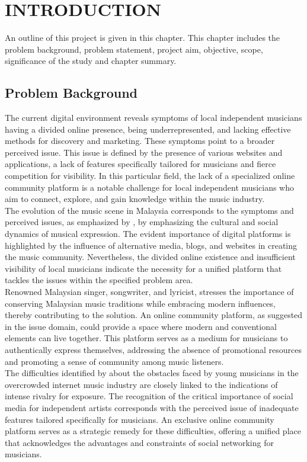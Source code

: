 \chapter{INTRODUCTION}
\label{ch:intro}
An outline of this project is given in this chapter. This chapter includes the problem background, problem statement, project aim, objective, scope, significance of the study and chapter summary.

\section{Problem Background}
The current digital environment reveals symptoms of local independent musicians having a divided online presence, being underrepresented, and lacking effective methods for discovery and marketing. These symptoms point to a broader perceived issue. This issue is defined by the presence of various websites and applications, a lack of features specifically tailored for musicians and fierce competition for visibility. In this particular field, the lack of a specialized online community platform is a notable challenge for local independent musicians who aim to connect, explore, and gain knowledge within the music industry. \\

The evolution of the music scene in Malaysia corresponds to the symptoms and perceived issues, as emphasized by \textcite{ong19}, by emphasizing the cultural and social dynamics of musical expression. The evident importance of digital platforms is highlighted by the influence of alternative media, blogs, and websites in creating the music community. Nevertheless, the divided online existence and insufficient visibility of local musicians indicate the necessity for a unified platform that tackles the issues within the specified problem area. \\

Renowned Malaysian singer, songwriter, and lyricist, \textcite{mohd21} stresses the importance of conserving Malaysian music traditions while embracing modern influences, thereby contributing to the solution. An online community platform, as suggested in the issue domain, could provide a space where modern and conventional elements can live together. This platform serves as a medium for musicians to authentically express themselves, addressing the absence of promotional resources and promoting a sense of community among music listeners. \\

The difficulties identified by \textcite{haynes18} about the obstacles faced by young musicians in the overcrowded internet music industry are closely linked to the indications of intense rivalry for exposure. The recognition of the critical importance of social media for independent artists corresponds with the perceived issue of inadequate features tailored specifically for musicians. An exclusive online community platform serves as a strategic remedy for these difficulties, offering a unified place that acknowledges the advantages and constraints of social networking for musicians. \\

